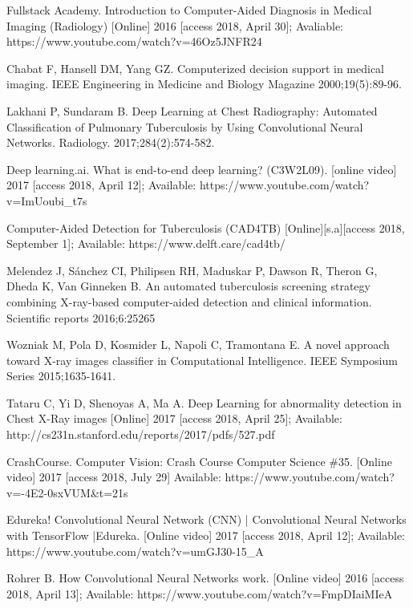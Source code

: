 \documentclass[15pt]{report}
\begin{document}
\begin{thebibliography}{cc}
 Fullstack Academy.  Introduction to Computer-Aided Diagnosis in Medical Imaging (Radiology) [Online] 2016 [access 2018, April 30]; Avaliable: https://www.youtube.com/watch?v=46Oz5JNFR24 

 Chabat F, Hansell DM, Yang GZ. Computerized decision support in medical imaging. IEEE Engineering in Medicine and Biology Magazine 2000;19(5):89-96.


 Lakhani P, Sundaram B. Deep Learning at Chest Radiography: Automated Classification of Pulmonary Tuberculosis by Using Convolutional Neural Networks. Radiology. 2017;284(2):574-582.

Deep learning.ai. What is end-to-end deep learning? (C3W2L09). [online video] 2017 [access 2018, April 12]; Available: https://www.youtube.com/watch?v=ImUoubi\_t7s

  Computer-Aided Detection for Tuberculosis (CAD4TB) [Online][s.a][access 2018, September 1]; Available: https://www.delft.care/cad4tb/

 Melendez J, Sánchez CI, Philipsen RH, Maduskar P, Dawson R, Theron G, Dheda K, Van Ginneken B. An automated tuberculosis screening strategy combining X-ray-based computer-aided detection and clinical information. Scientific reports 2016;6:25265

 Wozniak M, Pola D, Kosmider L, Napoli C, Tramontana E. A novel approach toward X-ray images classifier in Computational Intelligence. IEEE Symposium Series 2015;1635-1641.

 Tataru C, Yi D, Shenoyas A, Ma A. Deep Learning for abnormality detection in Chest X-Ray images [Online] 2017 [access 2018, April 25]; Available: http://cs231n.stanford.edu/reports/2017/pdfs/527.pdf

 CrashCourse. Computer Vision: Crash Course Computer Science \#35. [Online video] 2017 [access 2018, July 29] Available: https://www.youtube.com/watch?v=-4E2-0sxVUM\&t=21s

 Edureka! Convolutional Neural Network (CNN) | Convolutional Neural Networks with TensorFlow |Edureka. [Online video] 2017 [access 2018, April 12]; Available: https://www.youtube.com/watch?v=umGJ30-15\_A

 Rohrer B. How Convolutional Neural Networks work. [Online video] 2016 [access 2018, April 13]; Available: https://www.youtube.com/watch?v=FmpDIaiMIeA


\end{thebibliography}
\end{document}
